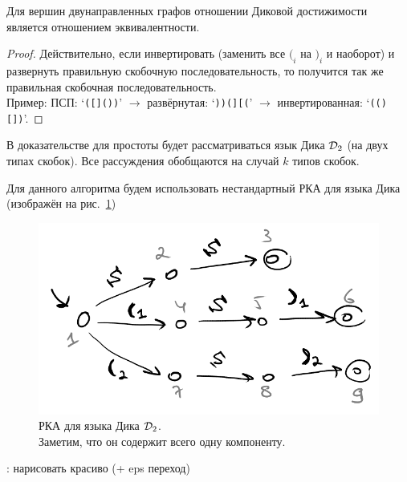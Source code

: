 \begin{lemma}\label{lemma:bidir_equiv}
  Для вершин двунаправленных графов отношении Диковой достижимости является отношением эквивалентности.
\end{lemma}
\begin{proof}

  Действительно, если инвертировать (заменить все $(_i$ на $)_i$ и наоборот) и развернуть правильную скобочную последовательность, то получится так же правильная скобочная последовательность.\\
  Пример: ПСП: `\texttt{([]())}' $\to$ развёрнутая: `\texttt{))(][(}' $\to$ инвертированная: `\texttt{(()[])}'.

\end{proof}

\begin{note}
  В доказательстве для простоты будет рассматриваться язык Дика $\mathcal{D}_2$ (на двух типах скобок). Все рассуждения обобщаются на случай $k$ типов скобок.
\end{note}

\begin{note}    
  Для данного алгоритма будем использовать нестандартный РКА для языка Дика (изображён на рис.~\ref{img:dyck_rsm})

  \begin{figure}[H]
      \includegraphics[width=0.75\linewidth]{img/dyck_rsm}
      \caption{РКА для языка Дика $\mathcal{D}_2$.\\ Заметим, что он содержит всего одну компоненту.}
      \label{img:dyck_rsm}
  \end{figure}

  \TODO: нарисовать красиво (+ eps переход)

\end{note}

